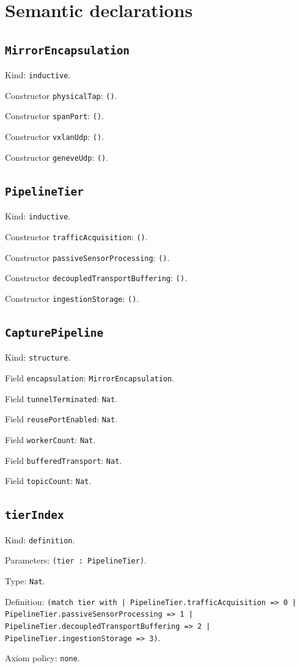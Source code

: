 \documentclass[11pt]{article}
\begin{document}
\section*{Semantic declarations}
\subsection*{\texttt{MirrorEncapsulation}}
\noindent Kind: \texttt{inductive}.\par
\noindent Constructor \texttt{physicalTap}: \texttt{()}.\par
\noindent Constructor \texttt{spanPort}: \texttt{()}.\par
\noindent Constructor \texttt{vxlanUdp}: \texttt{()}.\par
\noindent Constructor \texttt{geneveUdp}: \texttt{()}.\par
\subsection*{\texttt{PipelineTier}}
\noindent Kind: \texttt{inductive}.\par
\noindent Constructor \texttt{trafficAcquisition}: \texttt{()}.\par
\noindent Constructor \texttt{passiveSensorProcessing}: \texttt{()}.\par
\noindent Constructor \texttt{decoupledTransportBuffering}: \texttt{()}.\par
\noindent Constructor \texttt{ingestionStorage}: \texttt{()}.\par
\subsection*{\texttt{CapturePipeline}}
\noindent Kind: \texttt{structure}.\par
\noindent Field \texttt{encapsulation}: \texttt{MirrorEncapsulation}.\par
\noindent Field \texttt{tunnelTerminated}: \texttt{Nat}.\par
\noindent Field \texttt{reusePortEnabled}: \texttt{Nat}.\par
\noindent Field \texttt{workerCount}: \texttt{Nat}.\par
\noindent Field \texttt{bufferedTransport}: \texttt{Nat}.\par
\noindent Field \texttt{topicCount}: \texttt{Nat}.\par
\subsection*{\texttt{tierIndex}}
\noindent Kind: \texttt{definition}.\par
\noindent Parameters: \texttt{(tier : PipelineTier)}.\par
\noindent Type: \texttt{Nat}.\par
\noindent Definition: \texttt{(match tier with | PipelineTier.trafficAcquisition => 0 | PipelineTier.passiveSensorProcessing => 1 | PipelineTier.decoupledTransportBuffering => 2 | PipelineTier.ingestionStorage => 3)}.\par
\noindent Axiom policy: \texttt{none}.\par
\end{document}
